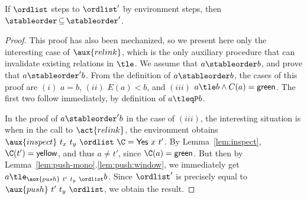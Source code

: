

\begin{lemma}\label{lem:jleq-stable}
If $\ordlist$ steps to $\ordlist'$ by environment steps, then
$\stableorder\,{\subseteq}\,\stableorder'$.
\end{lemma}

\begin{proof}
This proof has also been mechanized, so we present here only the
interesting case of $\aux{relink}$, which is the only auxiliary
procedure that can invalidate existing relations in $\tle$. We assume
that $a \stableorder b$, and prove that $a \stableorder' b$. From the definition of
$a \stableorder b$, the cases of this proof are $(i)$ $a = b$, $(ii)$ $E(a) <
b$, and $(iii)$ $a \tle b \wedge C(a)=\mathsf{green}$. The first two
follow immediately, by definition of $a \tleqP b$.

In the proof of $a \stableorder' b$ in the case of $(iii)$, the interesting
situation is when in the call to $\act{relink}$, the environment
obtains $\aux{inspect}\ t_x\ t_y\ \ordlist\ \C =
\mathsf{Yes}\ x\ t'$. By Lemma~\ref{lem:inspect}, $\C(t') =
\mathsf{yellow}$, and thus $a \neq t'$, since
$\C(a)=\mathsf{green}$. But then by
Lemma~\ref{lem:push-mono}.\ref{lem:push:window}, we immediately get $a
\tle_{\aux{push}\ t'\ t_y\ \ordlist} b$.  Since $\ordlist'$ is
precisely equal to $\aux{push}\ t'\ t_y\ \ordlist$, we obtain the
result.
\end{proof}

%

